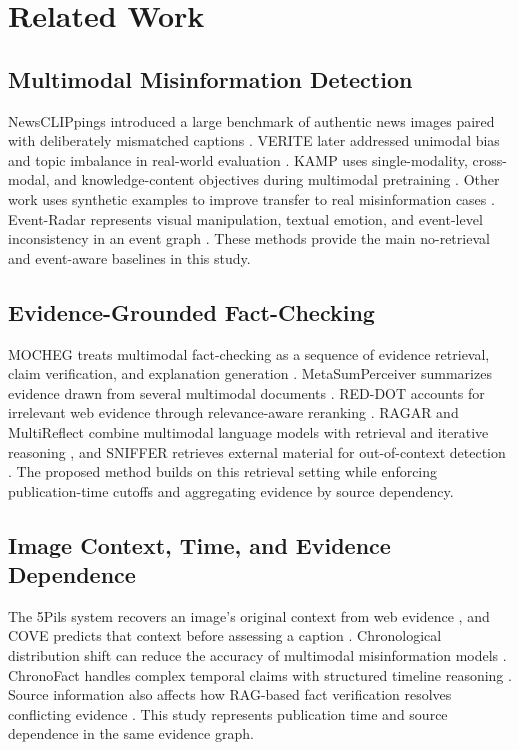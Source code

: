 \section{Related Work}

\subsection{Multimodal Misinformation Detection}

NewsCLIPpings introduced a large benchmark of authentic news images paired with deliberately mismatched captions \cite{luo2021newsclippings}. VERITE later addressed unimodal bias and topic imbalance in real-world evaluation \cite{papadopoulos2024verite}. KAMP uses single-modality, cross-modal, and knowledge-content objectives during multimodal pretraining \cite{zhang2025kamp}. Other work uses synthetic examples to improve transfer to real misinformation cases \cite{zeng2024synthetic}. Event-Radar represents visual manipulation, textual emotion, and event-level inconsistency in an event graph \cite{ma2024eventradar}. These methods provide the main no-retrieval and event-aware baselines in this study.

\subsection{Evidence-Grounded Fact-Checking}

MOCHEG treats multimodal fact-checking as a sequence of evidence retrieval, claim verification, and explanation generation \cite{yao2023mocheg}. MetaSumPerceiver summarizes evidence drawn from several multimodal documents \cite{chen2024metasum}. RED-DOT accounts for irrelevant web evidence through relevance-aware reranking \cite{papadopoulos2025reddot}. RAGAR and MultiReflect combine multimodal language models with retrieval and iterative reasoning \cite{khaliq2024ragar,kangur2025multireflect}, and SNIFFER retrieves external material for out-of-context detection \cite{qi2024sniffer}. The proposed method builds on this retrieval setting while enforcing publication-time cutoffs and aggregating evidence by source dependency.

\subsection{Image Context, Time, and Evidence Dependence}

The 5Pils system recovers an image's original context from web evidence \cite{tonglet2024image}, and COVE predicts that context before assessing a caption \cite{tonglet2025cove}. Chronological distribution shift can reduce the accuracy of multimodal misinformation models \cite{stepanova2023temporal}. ChronoFact handles complex temporal claims with structured timeline reasoning \cite{barik2025chronofact}. Source information also affects how RAG-based fact verification resolves conflicting evidence \cite{ge2025conflicting}. This study represents publication time and source dependence in the same evidence graph.

